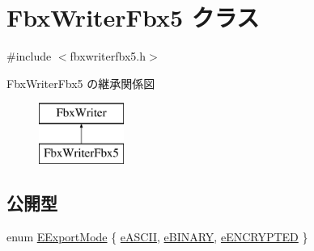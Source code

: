 \hypertarget{class_fbx_writer_fbx5}{}\section{Fbx\+Writer\+Fbx5 クラス}
\label{class_fbx_writer_fbx5}


{\ttfamily \#include $<$fbxwriterfbx5.\+h$>$}

Fbx\+Writer\+Fbx5 の継承関係図\begin{figure}[H]
\begin{center}
\leavevmode
\includegraphics[height=2.000000cm]{class_fbx_writer_fbx5}
\end{center}
\end{figure}
\subsection*{公開型}
\begin{DoxyCompactItemize}
\item 
enum \hyperlink{class_fbx_writer_fbx5_a0424a2f24c66021ce1bfe4477eb4209e}{E\+Export\+Mode} \{ \hyperlink{class_fbx_writer_fbx5_a0424a2f24c66021ce1bfe4477eb4209ea621f1d3ad7d63e3eb7c8be9b5e7f072e}{e\+A\+S\+C\+II}, 
\hyperlink{class_fbx_writer_fbx5_a0424a2f24c66021ce1bfe4477eb4209eabf07ca4fdfacef5a90a50627c9a2a914}{e\+B\+I\+N\+A\+RY}, 
\hyperlink{class_fbx_writer_fbx5_a0424a2f24c66021ce1bfe4477eb4209ea5530b888a8d36848ea14f4392340b2bf}{e\+E\+N\+C\+R\+Y\+P\+T\+ED}
 \}
\end{DoxyCompactItemize}
